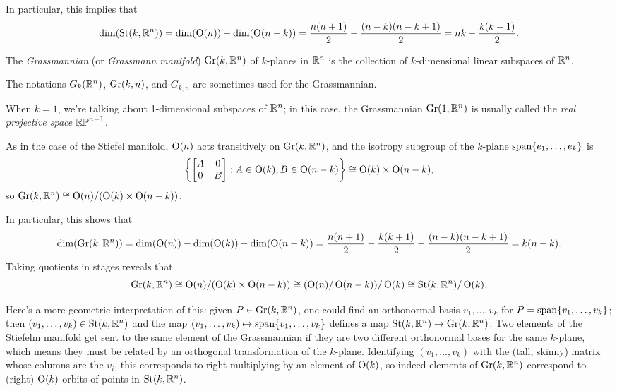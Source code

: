 In particular, this implies that
\[
	\dim(\operatorname{St}(k,\mathbb{R}^n)) = \dim(\operatorname{O}(n)) - \dim(\operatorname{O}(n-k)) = \frac{n(n+1)}{2} - \frac{(n-k)(n-k+1)}{2} = nk - \frac{k(k-1)}{2}.
\]


\begin{definition}\label{def:grassmannian}
	The \emph{Grassmannian} (or \emph{Grassmann manifold}) $\operatorname{Gr}(k,\mathbb{R}^n)$ of $k$-planes in $\mathbb{R}^n$ is the collection of $k$-dimensional linear subspaces of $\mathbb{R}^n$.
\end{definition}

\begin{remark}
	The notations $G_k(\mathbb{R}^n)$, $\operatorname{Gr}(k,n)$, and $G_{k,n}$ are sometimes used for the Grassmannian.
\end{remark}

\begin{example}\label{ex:projective space as grassmannian}
	When $k=1$, we're talking about 1-dimensional subspaces of $\mathbb{R}^n$; in this case, the Grassmannian $\operatorname{Gr}(1,\mathbb{R}^n)$ is usually called the \emph{real projective space} $\mathbb{RP}^{n-1}$.
\end{example}

As in the case of the Stiefel manifold, $\operatorname{O}(n)$ acts transitively on $\operatorname{Gr}(k,\mathbb{R}^n)$, and the isotropy subgroup of the $k$-plane $\operatorname{span} \{e_1, \dots , e_k\}$ is
\[
	\left\{ \begin{bmatrix} A & 0 \\ 0 & B \end{bmatrix} : A \in \operatorname{O}(k), B \in \operatorname{O}(n-k)\right\} \cong \operatorname{O}(k) \times \operatorname{O}(n-k),
\]
so $\operatorname{Gr}(k,\mathbb{R}^n) \cong \operatorname{O}(n)/(\operatorname{O}(k) \times \operatorname{O}(n-k))$.

In particular, this shows that 
\[
	\dim (\operatorname{Gr}(k, \mathbb{R}^n)) = \dim(\operatorname{O}(n)) - \dim(\operatorname{O}(k)) - \dim(\operatorname{O}(n-k)) = \frac{n(n+1)}{2} - \frac{k(k+1)}{2} - \frac{(n-k)(n-k+1)}{2} = k(n-k).
\]
Taking quotients in stages reveals that
\[
	\operatorname{Gr}(k,\mathbb{R}^n) \cong \operatorname{O}(n)/(\operatorname{O}(k) \times \operatorname{O}(n-k)) \cong (\operatorname{O}(n)/\operatorname{O}(n-k))/\operatorname{O}(k) \cong \operatorname{St}(k,\mathbb{R}^n)/\operatorname{O}(k).
\]

Here's a more geometric interpretation of this: given $P \in \operatorname{Gr}(k,\mathbb{R}^n)$, one could find an orthonormal basis $v_1, \dots , v_k$ for $P = \operatorname{span}\{v_1,\dots, v_k\}$; then $(v_1, \dots , v_k) \in \operatorname{St}(k,\mathbb{R}^n)$ and the map $(v_1, \dots , v_k) \mapsto \operatorname{span}\{v_1, \dots , v_k\}$ defines a map $\operatorname{St}(k,\mathbb{R}^n) \to \operatorname{Gr}(k,\mathbb{R}^n)$. Two elements of the Stiefelm manifold get sent to the same element of the Grassmannian if they are two different orthonormal bases for the same $k$-plane, which means they must be related by an orthogonal transformation of the $k$-plane. Identifying $(v_1, \dots , v_k)$ with the (tall, skinny) matrix whose columns are the $v_i$, this corresponds to right-multiplying by an element of $\operatorname{O}(k)$, so indeed elements of $\operatorname{Gr}(k,\mathbb{R}^n)$ correspond to (right) $\operatorname{O}(k)$-orbits of points in $\operatorname{St}(k,\mathbb{R}^n)$.

